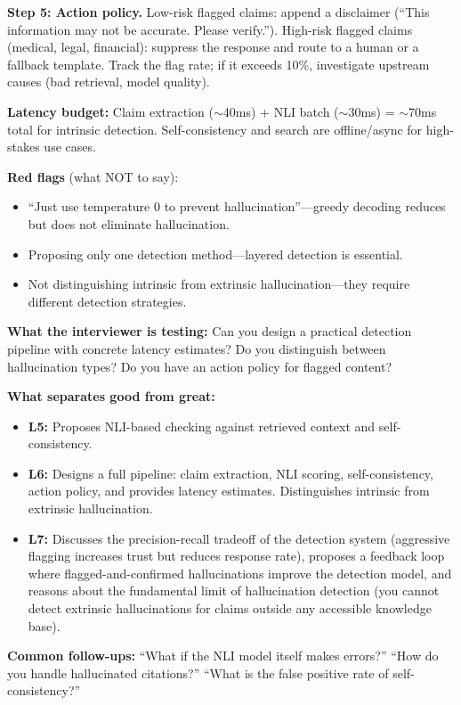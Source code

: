 \begin{interviewq}
\textbf{Step 5: Action policy.} Low-risk flagged claims: append a disclaimer (``This information may not be accurate. Please verify.''). High-risk flagged claims (medical, legal, financial): suppress the response and route to a human or a fallback template. Track the flag rate; if it exceeds 10\%, investigate upstream causes (bad retrieval, model quality).

\textbf{Latency budget:} Claim extraction ($\sim$40ms) + NLI batch ($\sim$30ms) = $\sim$70ms total for intrinsic detection. Self-consistency and search are offline/async for high-stakes use cases.

\textbf{Red flags} (what NOT to say):
\begin{itemize}
    \item ``Just use temperature 0 to prevent hallucination''---greedy decoding reduces but does not eliminate hallucination.
    \item Proposing only one detection method---layered detection is essential.
    \item Not distinguishing intrinsic from extrinsic hallucination---they require different detection strategies.
\end{itemize}

\textbf{What the interviewer is testing:} Can you design a practical detection pipeline with concrete latency estimates? Do you distinguish between hallucination types? Do you have an action policy for flagged content?

\textbf{What separates good from great:}
\begin{itemize}
    \item \textbf{L5:} Proposes NLI-based checking against retrieved context and self-consistency.
    \item \textbf{L6:} Designs a full pipeline: claim extraction, NLI scoring, self-consistency, action policy, and provides latency estimates. Distinguishes intrinsic from extrinsic hallucination.
    \item \textbf{L7:} Discusses the precision-recall tradeoff of the detection system (aggressive flagging increases trust but reduces response rate), proposes a feedback loop where flagged-and-confirmed hallucinations improve the detection model, and reasons about the fundamental limit of hallucination detection (you cannot detect extrinsic hallucinations for claims outside any accessible knowledge base).
\end{itemize}

\textbf{Common follow-ups:} ``What if the NLI model itself makes errors?'' ``How do you handle hallucinated citations?'' ``What is the false positive rate of self-consistency?''
\end{interviewq}

